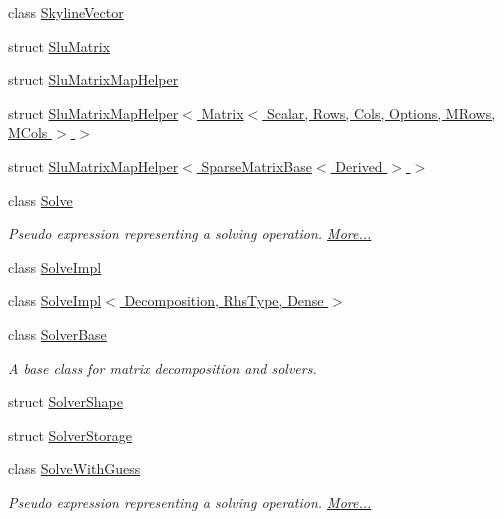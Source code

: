 \begin{DoxyCompactItemize}
class \hyperlink{class_eigen_1_1_skyline_vector}{Skyline\+Vector}
\item 
struct \hyperlink{struct_eigen_1_1_slu_matrix}{Slu\+Matrix}
\item 
struct \hyperlink{struct_eigen_1_1_slu_matrix_map_helper}{Slu\+Matrix\+Map\+Helper}
\item 
struct \hyperlink{struct_eigen_1_1_slu_matrix_map_helper_3_01_matrix_3_01_scalar_00_01_rows_00_01_cols_00_01_optioce31c400c0dc6b34c9e9bbf922bc7aae}{Slu\+Matrix\+Map\+Helper$<$ Matrix$<$ Scalar, Rows, Cols, Options, M\+Rows, M\+Cols $>$ $>$}
\item 
struct \hyperlink{struct_eigen_1_1_slu_matrix_map_helper_3_01_sparse_matrix_base_3_01_derived_01_4_01_4}{Slu\+Matrix\+Map\+Helper$<$ Sparse\+Matrix\+Base$<$ Derived $>$ $>$}
\item 
class \hyperlink{group___core___module_class_eigen_1_1_solve}{Solve}
\begin{DoxyCompactList}\small\item\em Pseudo expression representing a solving operation.  \hyperlink{group___core___module_class_eigen_1_1_solve}{More...}\end{DoxyCompactList}\item 
class \hyperlink{class_eigen_1_1_solve_impl}{Solve\+Impl}
\item 
class \hyperlink{class_eigen_1_1_solve_impl_3_01_decomposition_00_01_rhs_type_00_01_dense_01_4}{Solve\+Impl$<$ Decomposition, Rhs\+Type, Dense $>$}
\item 
class \hyperlink{class_eigen_1_1_solver_base}{Solver\+Base}
\begin{DoxyCompactList}\small\item\em A base class for matrix decomposition and solvers. \end{DoxyCompactList}\item 
struct \hyperlink{struct_eigen_1_1_solver_shape}{Solver\+Shape}
\item 
struct \hyperlink{struct_eigen_1_1_solver_storage}{Solver\+Storage}
\item 
class \hyperlink{group___iterative_linear_solvers___module_class_eigen_1_1_solve_with_guess}{Solve\+With\+Guess}
\begin{DoxyCompactList}\small\item\em Pseudo expression representing a solving operation.  \hyperlink{group___iterative_linear_solvers___module_class_eigen_1_1_solve_with_guess}{More...}\end{DoxyCompactList}\item 

\end{DoxyCompactItemize}
